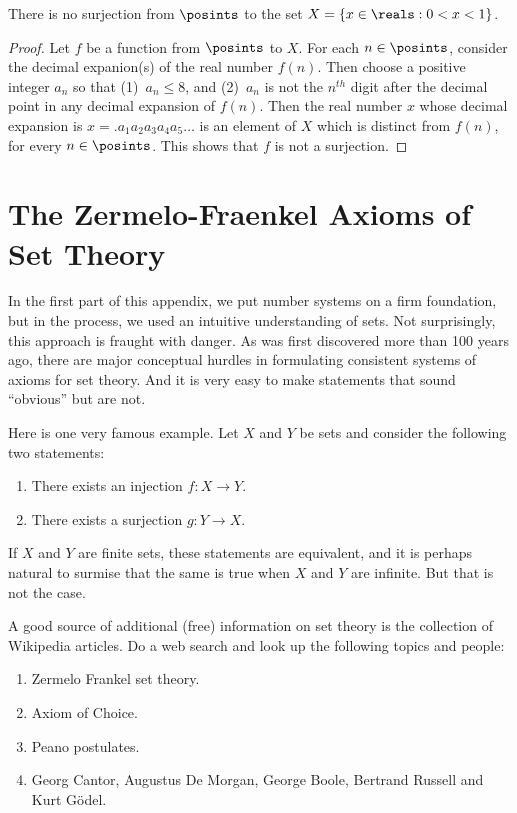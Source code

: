 \begin{proposition} 
There is no surjection from $\posints$ to the
set $X= \{x\in\reals:0<x<1\}$.
\end{proposition}

\begin{proof}
Let $f$ be a function from $\posints$ to $X$.
For each $n\in \posints$, consider the decimal
expanion(s) of the real number $f(n)$.  Then
choose a positive integer $a_n$ so that (1)~$a_n\le 8$, and
(2)~$a_n$ is not the $n^{th}$ digit after the decimal
point in any decimal expansion of $f(n)$.
Then the real number $x$ whose decimal expansion
is $x=.a_1a_2a_3a_4a_5\dots$ is an element of $X$
which is distinct from $f(n)$, for every $n\in\posints$.
This shows that $f$ is not a surjection.
\end{proof}

\section{The Zermelo-Fraenkel Axioms of Set Theory}

In the first part of this appendix, 
we put number systems on a firm foundation, but in the
process, we used an intuitive understanding of sets.
Not surprisingly, this approach is fraught with danger.  As was first discovered
more than 100 years ago, there are major conceptual hurdles
in formulating consistent systems of axioms for set theory.
And it is very easy to make statements that sound ``obvious''
but are not.

Here is one very famous example.  Let $X$ and $Y$ be
sets and consider the following two
statements:

\begin{enumerate}
\item There exists an injection $f:X\rightarrow Y$.
\item There exists a surjection $g:Y\rightarrow X$.
\end{enumerate}
If $X$ and $Y$ are finite sets, these statements are
equivalent, and it is perhaps natural to surmise that the
same is true when $X$ and $Y$ are infinite.  But that is not
the case.

A good source of additional (free) information on set theory is
the collection of Wikipedia articles.  Do a web search and
look up the following topics and people:

\begin{enumerate}
\item Zermelo Frankel set theory.
\item Axiom of Choice.
\item Peano postulates.
\item Georg Cantor, Augustus De Morgan, George Boole, Bertrand Russell
and Kurt G\"odel.
\end{enumerate}

